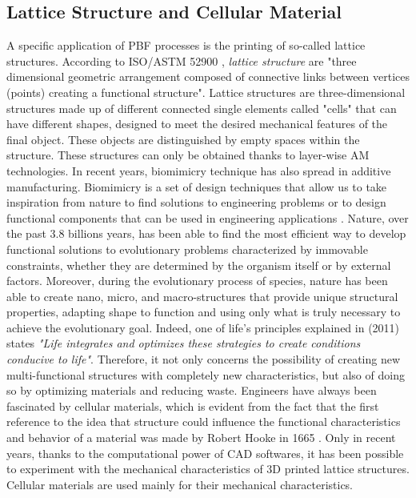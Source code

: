 \subsection{Lattice Structure and Cellular Material} \label{subsec:lattice}
A specific application of PBF processes is the printing of so-called lattice structures. According to ISO/ASTM 52900 \cite{organization_isoastm_2015}, \emph{lattice structure} are "three dimensional geometric arrangement composed of connective links between vertices (points) creating a functional structure". Lattice structures are three-dimensional structures made up of different connected single elements called "cells" that can have different shapes, designed to meet the desired mechanical features of the final object. These objects are distinguished by empty spaces within the structure. These structures can only be obtained thanks to layer-wise AM technologies. In recent years, biomimicry technique has also spread in additive manufacturing. Biomimicry is a set of design techniques that allow us to take inspiration from nature to find solutions to engineering problems or to design functional components that can be used in engineering applications \cite{pathak_biomimicry_2019, du_plessis_beautiful_2019}. Nature, over the past 3.8 billions years, has been able to find the most efficient way to develop functional solutions to evolutionary problems characterized by immovable constraints, whether they are determined by the organism itself or by external factors. Moreover, during the evolutionary process of species, nature has been able to create nano, micro, and macro-structures that provide unique structural properties, adapting shape to function and using only what is truly necessary to achieve the evolutionary goal. Indeed, one of life's principles explained in \citeauthor{baumeister_biomimicry_2011} (2011) states \textit{"Life integrates and optimizes these strategies to create conditions conducive to life"}. Therefore, it not only concerns the possibility of creating new multi-functional structures with completely new characteristics, but also of doing so by optimizing materials and reducing waste. Engineers have always been fascinated by cellular materials, which is evident from the fact that the first reference to the idea that structure could influence the functional characteristics and behavior of a material was made by Robert Hooke in 1665 \cite{l_gibson_cellular_2010}. Only in recent years, thanks to the computational power of CAD softwares, it has been possible to experiment with the mechanical characteristics of 3D printed lattice structures. Cellular materials are used mainly for their mechanical characteristics.
